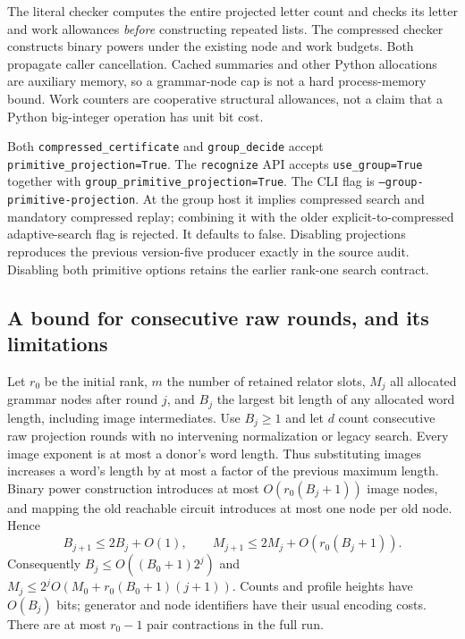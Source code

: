 The literal checker computes the entire projected letter count and checks
its letter and work allowances \emph{before} constructing repeated lists.
The compressed checker constructs binary powers under the existing node
and work budgets. Both propagate caller cancellation. Cached summaries and
other Python allocations are auxiliary memory, so a grammar-node cap is
not a hard process-memory bound. Work counters are cooperative structural
allowances, not a claim that a Python big-integer operation has unit bit cost.

Both \texttt{compressed\_certificate} and \texttt{group\_decide}
accept \texttt{primitive\_projection=True}. The \texttt{recognize} API
accepts \texttt{use\_group=True} together with
\texttt{group\_primitive\_projection=True}.
The CLI flag is \texttt{--group-primitive-projection}. At the group host it
implies compressed search and mandatory compressed replay; combining it
with the older explicit-to-compressed adaptive-search flag is rejected.
It defaults to false. Disabling projections reproduces the previous
version-five producer exactly in the source audit. Disabling both primitive
options retains the earlier rank-one search contract.

\subsection{A bound for consecutive raw rounds, and its limitations}

Let $r_0$ be the initial rank, $m$ the number of retained relator slots,
$M_j$ all allocated grammar nodes after round $j$, and $B_j$ the largest
bit length of any allocated word length, including image intermediates.
Use $B_j\ge1$ and let $d$ count consecutive raw projection rounds with no
intervening normalization or legacy search. Every image exponent is at
most a donor's word length. Thus substituting images increases a word's
length by at most a factor of the previous maximum length. Binary power
construction introduces at most $O(r_0(B_j+1))$ image nodes, and mapping the
old reachable circuit introduces at most one node per old node. Hence
\[
 B_{j+1}\le 2B_j+O(1),\qquad
 M_{j+1}\le 2M_j+O(r_0(B_j+1)).
\]
Consequently $B_j\le O((B_0+1)2^j)$ and
$M_j\le 2^j O(M_0+r_0(B_0+1)(j+1))$. Counts and profile heights have
$O(B_j)$ bits; generator and node identifiers have their usual encoding
costs. There are at most $r_0-1$ pair contractions in the full run.

